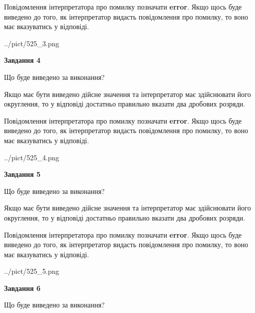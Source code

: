 \documentclass[12pt, ukrainian]{article}
\begin{document}
{\begin {Large}
Повідомлення інтерпретатора про помилку позначати \textbf{error}.
Якщо щось буде виведено до того, як інтерпретатор видасть повідомлення про помилку, 
то воно має вказуватись у відповіді. \par

\begin{center}
	{../pict/525_3.png}
\end{center}
\newpage

{\begin {center}\textbf{Завдання 4}\end {center}}\par
Що буде виведено за виконання? \par

Якщо має бути виведено дійсне значення та інтерпретатор має здійснювати його округлення, 
то у відповіді достатньо правильно вказати два дробових розряди.

Повідомлення інтерпретатора про помилку позначати \textbf{error}.
Якщо щось буде виведено до того, як інтерпретатор видасть повідомлення про помилку, 
то воно має вказуватись у відповіді. \par

\begin{center}
	{../pict/525_4.png}
\end{center}
\newpage

{\begin {center}\textbf{Завдання 5}\end {center}}\par
Що буде виведено за виконання? \par

Якщо має бути виведено дійсне значення та інтерпретатор має здійснювати його округлення, 
то у відповіді достатньо правильно вказати два дробових розряди.

Повідомлення інтерпретатора про помилку позначати \textbf{error}.
Якщо щось буде виведено до того, як інтерпретатор видасть повідомлення про помилку, 
то воно має вказуватись у відповіді. \par

\begin{center}
	{../pict/525_5.png}
\end{center}
\newpage

{\begin {center}\textbf{Завдання 6}\end {center}}\par
Що буде виведено за виконання? \par


\end{Large}}
\end{document}
